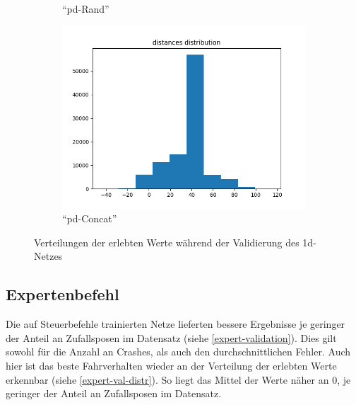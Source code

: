 \begin{figure}[H]
\begin{subfigure}[h]{0.3\textwidth}
		\caption{``\acs{pd}-Rand''}
		\label{1d-pd-rand-val-distr}
	\end{subfigure}
	\begin{subfigure}[h]{0.3\textwidth}
		\centering
		\includegraphics[width=\linewidth]{kapitel5/images/eval/d-only/pd-concat-distr.png}
		\caption{``\acs{pd}-Concat''}
		\label{1d-pd-concat-val-distr}
	\end{subfigure}
	\caption{Verteilungen der erlebten Werte während der Validierung des \acs{1d}-Netzes}
	\label{1d-val-distr}
\end{figure}

\subsection{Expertenbefehl}

Die auf Steuerbefehle trainierten Netze lieferten bessere Ergebnisse je geringer der Anteil an Zufallsposen im Datensatz (siehe \ref{expert-validation}). Dies gilt sowohl für die Anzahl an Crashes, als auch den durchschnittlichen Fehler.
Auch hier ist das beste Fahrverhalten wieder an der Verteilung der erlebten Werte erkennbar (siehe \ref{expert-val-distr}). So liegt das Mittel der Werte näher an 0, je geringer der Anteil an Zufallsposen im Datensatz.

